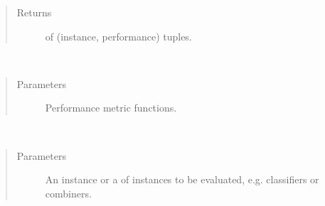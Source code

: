 \documentclass[letterpaper,10pt,english]{sphinxmanual}
\begin{document}
\begin{fulllineitems}
\begin{fulllineitems}
\begin{quote}
\begin{description}
\item[{Returns}] \leavevmode
\sphinxAtStartPar
{} of (instance, performance) tuples.

\end{description}\end{quote}

\end{fulllineitems}


\begin{fulllineitems}
\label{\detokenize{pusion.evaluation.evaluation:pusion.evaluation.evaluation.Evaluation.set_metrics}}~\begin{quote}\begin{description}
\item[{Parameters}] \leavevmode
\sphinxAtStartPar
{} \textendash{} Performance metric functions.

\end{description}\end{quote}

\end{fulllineitems}


\begin{fulllineitems}
\label{\detokenize{pusion.evaluation.evaluation:pusion.evaluation.evaluation.Evaluation.set_instances}}~\begin{quote}\begin{description}
\item[{Parameters}] \leavevmode
\sphinxAtStartPar
{} \textendash{} An instance or a  of instances to be evaluated, e.g. classifiers or combiners.

\end{description}\end{quote}

\end{fulllineitems}


\end{fulllineitems}
\end{document}
